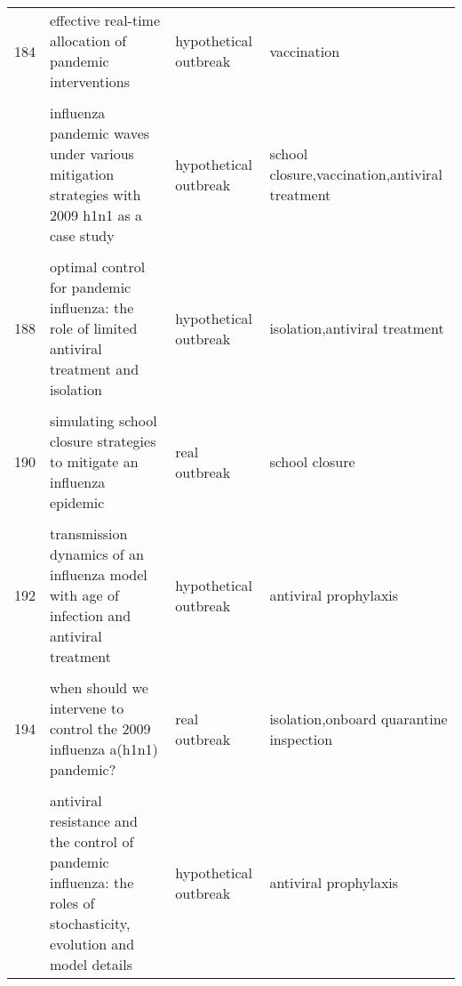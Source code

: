 \documentclass[
]{article}
\begin{document}
\begin{landscape}
\begin{longtable}{l>{\raggedright\arraybackslash}p{3cm}l>{\raggedright\arraybackslash}p{8cm}}
184 & effective real-time allocation of pandemic interventions & hypothetical outbreak & vaccination\\
\cellcolor{gray!6}{185} & \cellcolor{gray!6}{efficient mitigation strategies for epidemics in rural regions} & \cellcolor{gray!6}{real outbreak} & \cellcolor{gray!6}{vaccination}\\
\addlinespace
186 & influenza pandemic waves under various mitigation strategies with 2009 h1n1 as a case study & hypothetical outbreak & school closure,vaccination,antiviral treatment\\
\cellcolor{gray!6}{187} & \cellcolor{gray!6}{is a mass immunization program for pandemic (h1n1) 2009 good value for money? early evidence from the canadian experience} & \cellcolor{gray!6}{hypothetical outbreak} & \cellcolor{gray!6}{mass immunization program}\\
188 & optimal control for pandemic influenza: the role of limited antiviral treatment and isolation & hypothetical outbreak & isolation,antiviral treatment\\
\cellcolor{gray!6}{189} & \cellcolor{gray!6}{optimizing vaccine allocation at different points in time during an epidemic} & \cellcolor{gray!6}{hypothetical outbreak} & \cellcolor{gray!6}{vaccination}\\
190 & simulating school closure strategies to mitigate an influenza epidemic & real outbreak & school closure\\
\addlinespace
\cellcolor{gray!6}{191} & \cellcolor{gray!6}{the effect of mask use on the spread of influenza during a pandemic} & \cellcolor{gray!6}{hypothetical outbreak} & \cellcolor{gray!6}{face masks}\\
192 & transmission dynamics of an influenza model with age of infection and antiviral treatment & hypothetical outbreak & antiviral prophylaxis\\
\cellcolor{gray!6}{193} & \cellcolor{gray!6}{transmission risks and control of foot-and-mouth disease in the netherlands: spatial patterns} & \cellcolor{gray!6}{real outbreak} & \cellcolor{gray!6}{culling}\\
194 & when should we intervene to control the 2009 influenza a(h1n1) pandemic? & real outbreak & isolation,onboard quarantine inspection\\
\cellcolor{gray!6}{195} & \cellcolor{gray!6}{adaptive vaccination strategies to mitigate pandemic influenza} & \cellcolor{gray!6}{real outbreak} & \cellcolor{gray!6}{vaccination}\\
\addlinespace
196 & antiviral resistance and the control of pandemic influenza: the roles of stochasticity, evolution and model details & hypothetical outbreak & antiviral prophylaxis\\

\end{longtable}
\end{landscape}
\end{document}
